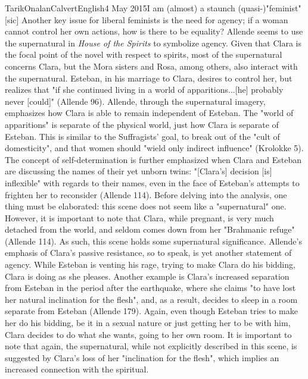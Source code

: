 \documentclass[12pt,a4paper]{article}
\begin{document}
\begin{mla}{Tarik}{Onalan}{Calvert}{English}{4 May 2015}{I am (almost) a staunch (quasi-)"feminist" [sic]}
        Another key issue for liberal feminists is the need for agency; if a woman cannot control her
        own actions, how is there to be equality? Allende seems to use the supernatural in \textit{House
        of the Spirits} to symbolize agency. Given that Clara is the focal point of the novel with
        respect to spirits, most of the supernatural concerns Clara, but the Mora sisters and Rosa,
        among others, also interact with the supernatural. Esteban, in his marriage to Clara, desires
        to control her, but realizes that "if she continued living in a world of apparitions...[he]
        probably never [could]" (Allende 96). Allende, through the supernatural imagery, emphasizes
        how Clara is able to remain independent of Esteban. The "world of apparitions" is separate of
        the physical world, just how Clara is separate of Esteban. This is similar to the Suffragists'
        goal, to break out of the "cult of domesticity", and that women should "wield only indirect
        influence" (Krolokke 5). The concept of self-determination is further emphasized when Clara
        and Esteban are discussing the names of their yet unborn twins: "[Clara's] decision [is]
        inflexible" with regards to their names, even in the face of Esteban's attempts to frighten
        her to reconsider (Allende 114). Before delving into the analysis, one thing must be elaborated:
        this scene does not seem like a "supernatural" one. However, it is important to note that Clara,
        while pregnant, is very much detached from the world, and seldom comes down from her "Brahmanic
        refuge" (Allende 114). As such, this scene holds some supernatural significance. Allende's
        emphasis of Clara's passive resistance, so to speak, is yet another statement of agency.
        While Esteban is venting his rage, trying to make Clara do his bidding, Clara is doing as
        she pleases. Another example is Clara's increased separation from Esteban in the period
        after the earthquake, where she claims "to have lost her natural inclination for the flesh",
        and, as a result, decides to sleep in a room separate from Esteban (Allende 179). Again,
        even though Esteban tries to make her do his bidding, be it in a sexual nature or just getting
        her to be with him, Clara decides to do what she wants, going to her own room. It is important
        to note that again, the supernatural, while not explicitly described in this scene, is
        suggested by Clara's loss of her "inclination for the flesh", which implies an increased
        connection with the spiritual.


\end{mla}
\end{document}
